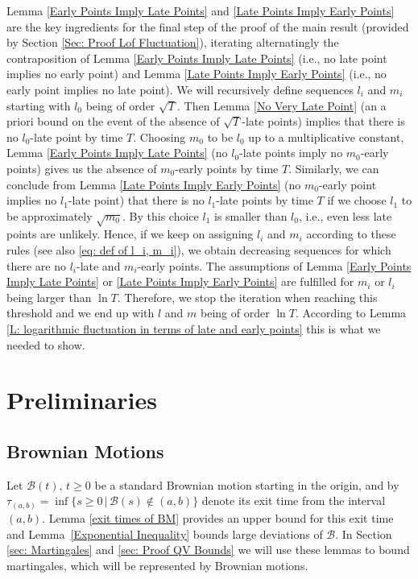 \documentclass[11pt]{article}
\numberwithin{equation}{section}
\begin{document}
Lemma \ref{Early Points Imply Late Points} and \ref{Late Points Imply Early Points} 
are the key ingredients for the final step 
of the proof of the main result (provided by Section \ref{Sec: Proof Lof Fluctuation}), 
iterating alternatingly the contraposition of Lemma \ref{Early Points Imply Late Points} 
(i.e., no late point implies no early point)
and Lemma \ref{Late Points Imply Early Points}
(i.e., no early point implies no late point).
We will recursively define sequences $l_i$ and $m_i$ starting 
with $l_0$ being of order $\sqrt{T}$.
Then Lemma \ref{No Very Late Point} (an a priori bound on the event of 
the absence of $\sqrt{T}$-late points) implies
that there is no $l_0$-late point by time $T$.  
Choosing $m_0$ to be $l_0$ up to a multiplicative constant, 
Lemma \ref{Early Points Imply Late Points} 
(no $l_0$-late points imply no $m_0$-early points) gives us  
the absence of $m_0$-early points by time $T$.  
Similarly, we can conclude from Lemma \ref{Late Points Imply Early Points} 
(no $m_0$-early point implies no $l_1$-late point) that there is no 
$l_1$-late points by time $T$ if we choose $l_1$ to be approximately $\sqrt{m_0}$.
By this choice $l_1$ is smaller than $l_0$, i.e., even less late points are unlikely. 
Hence, if we keep on assigning $l_i$ and $m_i$ according to these rules 
(see also \eqref{eq: def of l_i, m_i}), 
we obtain decreasing sequences for which there are no $l_i$-late and $m_i$-early points.
The assumptions of Lemma \ref{Early Points Imply Late Points} or \ref{Late Points Imply Early Points} 
are fulfilled for $m_i$ or $l_i$ being larger than $\ln T$. 
Therefore, we stop the iteration when reaching this threshold 
and we end up with $l$ and $m$ being of order $\ln T$.
According to Lemma \ref{L: logarithmic fluctuation in terms of late and early points} 
this is what we needed to show.


\section{Preliminaries}

\subsection{Brownian Motions}
Let $\mathcal{B}(t)$, $t \geq 0$ be a standard Brownian motion
starting in the origin, and by
$\tau_{(a,b)} = \inf\{s \geq 0 \,|\,\mathcal{B}(s) \notin (a,b)\}$ 
denote its exit time from the interval $(a,b)$.
Lemma \ref{exit times of BM} provides 
an upper bound for this exit time and 
\hbox{Lemma \ref{Exponential Inequality}} bounds large deviations of $\mathcal{B}$. 
In Section \ref{sec: Martingales} and \ref{sec: Proof QV Bounds} 
we will use these lemmas to bound martingales, 
which will be represented by Brownian motions. 
\end{document}
